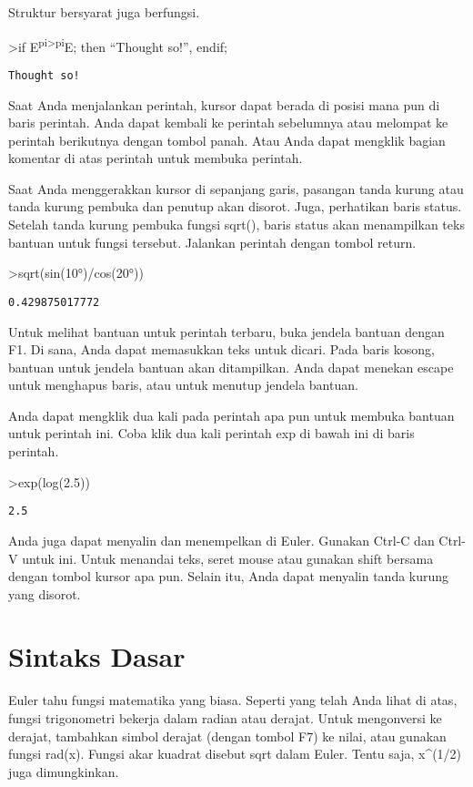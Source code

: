 \documentclass[
]{book}
\begin{document}
Struktur bersyarat juga berfungsi.

\textgreater if E\textsuperscript{pi\textgreater pi}E; then ``Thought so!'', endif;

\begin{verbatim}
Thought so!
\end{verbatim}

Saat Anda menjalankan perintah, kursor dapat berada di posisi mana pun di baris perintah. Anda dapat kembali ke perintah sebelumnya atau melompat ke perintah berikutnya dengan tombol panah. Atau Anda dapat mengklik bagian komentar di atas perintah untuk membuka perintah.

Saat Anda menggerakkan kursor di sepanjang garis, pasangan tanda kurung atau tanda kurung pembuka dan penutup akan disorot. Juga, perhatikan baris status. Setelah tanda kurung pembuka fungsi sqrt(), baris status akan menampilkan teks bantuan untuk fungsi tersebut. Jalankan perintah dengan tombol return.

\textgreater sqrt(sin(10°)/cos(20°))

\begin{verbatim}
0.429875017772
\end{verbatim}

Untuk melihat bantuan untuk perintah terbaru, buka jendela bantuan dengan F1. Di sana, Anda dapat memasukkan teks untuk dicari. Pada baris kosong, bantuan untuk jendela bantuan akan ditampilkan. Anda dapat menekan escape untuk menghapus baris, atau untuk menutup jendela bantuan.

Anda dapat mengklik dua kali pada perintah apa pun untuk membuka bantuan untuk perintah ini. Coba klik dua kali perintah exp di bawah ini di baris perintah.

\textgreater exp(log(2.5))

\begin{verbatim}
2.5
\end{verbatim}

Anda juga dapat menyalin dan menempelkan di Euler. Gunakan Ctrl-C dan Ctrl-V untuk ini. Untuk menandai teks, seret mouse atau gunakan shift bersama dengan tombol kursor apa pun. Selain itu, Anda dapat menyalin tanda kurung yang disorot.

\section{Sintaks Dasar}\label{sintaks-dasar}

Euler tahu fungsi matematika yang biasa. Seperti yang telah Anda lihat di atas, fungsi trigonometri bekerja dalam radian atau derajat. Untuk mengonversi ke derajat, tambahkan simbol derajat (dengan tombol F7) ke nilai, atau gunakan fungsi rad(x). Fungsi akar kuadrat disebut sqrt dalam Euler. Tentu saja, x\^{}(1/2) juga dimungkinkan.
\end{document}
